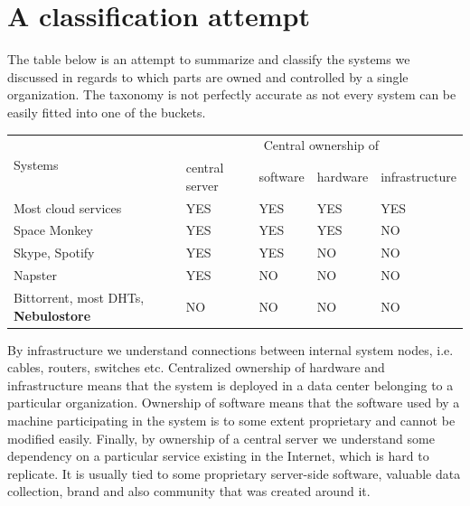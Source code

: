\documentclass{pracamgren}
\begin{document}
\section{A classification attempt}

The table below is an attempt to summarize and classify the systems we discussed in regards to which parts are owned and controlled by a single organization. The taxonomy is not perfectly accurate as not every system can be easily fitted into one of the buckets.

\begin{center}
    \begin{tabular}{ | l | l | l | l | l |}
    \hline
    \multirow{2}{*}{Systems} & \multicolumn{4}{|c|}{Central ownership of} \\
    \cline{2-5}
     & central server & software & hardware & infrastructure \\
    \hline
    Most cloud services & YES & YES & YES & YES \\
    \hline
    Space Monkey & YES & YES & YES & NO \\
    \hline
    Skype, Spotify & YES & YES & NO & NO\\
    \hline
    Napster & YES & NO & NO & NO\\
    \hline
    Bittorrent, most DHTs, {\bf Nebulostore} & NO & NO & NO & NO \\
    \hline
    \end{tabular}
\end{center}

By infrastructure we understand connections between internal system nodes, i.e. cables, routers, switches etc.
Centralized ownership of hardware and infrastructure means that the system is deployed in a data center belonging to a particular organization. Ownership of software means that the software used by a machine participating in the system is to some extent proprietary and cannot be modified easily. Finally, by ownership of a central server we understand some dependency on a particular service existing in the Internet, which is hard to replicate. It is usually tied to some proprietary server-side software, valuable data collection, brand and also community that was created around it.\\
\end{document}
